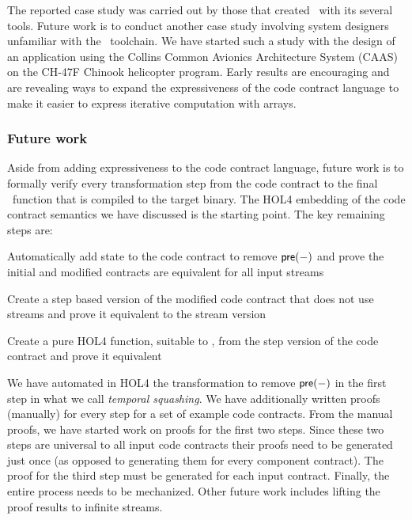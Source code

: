 The reported case study was carried out by those that created \brfcs\ with its several tools.
Future work is to conduct another case study involving system designers unfamiliar with the \brfcs\ toolchain.
We have started such a study with the design of
an application using the Collins Common Avionics Architecture System
(CAAS)~\cite{caas} on the CH-47F Chinook helicopter program.
Early results are encouraging and are revealing ways to expand the expressiveness of the code contract language to make it easier to express iterative computation with arrays.

\subsubsection{Future work}

Aside from adding expressiveness to the code contract language, future
work is to formally verify every transformation step from the code
contract to the final \ckml\ function that is compiled to the target
binary.  The HOL4 embedding of the code contract semantics we have
discussed is the starting point.  The key remaining steps are:
\begin{compactitem}
  \item Automatically add state to the code contract to remove $\mathsf{pre}(-)$ and prove the initial and modified contracts are equivalent for all input streams
  \item Create a step based version of the modified code contract that does not use streams and prove it equivalent to the stream version
  \item Create a pure HOL4 function, suitable to \ckml, from the step version of the code contract and prove it equivalent
\end{compactitem}
We have automated in HOL4 the transformation to remove $\mathsf{pre}(-)$ in the first step in what we call \emph{temporal squashing}.
We have additionally written proofs (manually) for every step for a set of example code contracts.
From the manual proofs, we have started work on proofs for the first two steps.
Since these two steps are universal to all input code contracts their proofs need to be generated just once (as opposed to generating them for every component contract).
The proof for the third step must be generated for each input
contract. Finally, the entire process needs to be mechanized.  Other
future work includes lifting the proof results to infinite streams.
